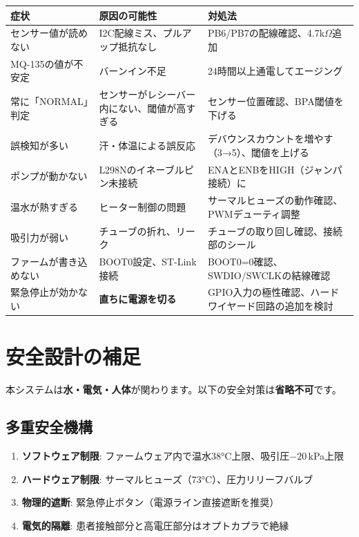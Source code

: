 \documentclass[a4paper,11pt]{article}
\begin{document}
\begin{longtable}{@{}p{4.5cm}p{4.5cm}p{5cm}@{}}
\toprule
\textbf{症状} & \textbf{原因の可能性} & \textbf{対処法} \\
\midrule
\endhead
センサー値が読めない & I2C配線ミス、プルアップ抵抗なし & PB6/PB7の配線確認、4.7k$\Omega$追加 \\
\addlinespace
MQ-135の値が不安定 & バーンイン不足 & 24時間以上通電してエージング \\
\addlinespace
常に「NORMAL」判定 & センサーがレシーバー内にない、閾値が高すぎる & センサー位置確認、BPA閾値を下げる \\
\addlinespace
誤検知が多い & 汗・体温による誤反応 & デバウンスカウントを増やす（3→5）、閾値を上げる \\
\addlinespace
ポンプが動かない & L298Nのイネーブルピン未接続 & ENAとENBをHIGH（ジャンパ接続）に \\
\addlinespace
温水が熱すぎる & ヒーター制御の問題 & サーマルヒューズの動作確認、PWMデューティ調整 \\
\addlinespace
吸引力が弱い & チューブの折れ、リーク & チューブの取り回し確認、接続部のシール \\
\addlinespace
ファームが書き込めない & BOOT0設定、ST-Link接続 & BOOT0=0確認、SWDIO/SWCLKの結線確認 \\
\addlinespace
緊急停止が効かない & \textcolor{warn}{\textbf{直ちに電源を切る}} & GPIO入力の極性確認、ハードワイヤード回路の追加を検討 \\
\bottomrule
\end{longtable}

\newpage
\section{安全設計の補足}

\begin{warningbox}
本システムは\textbf{水・電気・人体}が関わります。以下の安全対策は\textbf{省略不可}です。
\end{warningbox}

\subsection{多重安全機構}

\begin{enumerate}[leftmargin=2em]
  \item \textbf{ソフトウェア制限}: ファームウェア内で温水38°C上限、吸引圧$-20$\,kPa上限
  \item \textbf{ハードウェア制限}: サーマルヒューズ（73°C）、圧力リリーフバルブ
  \item \textbf{物理的遮断}: 緊急停止ボタン（電源ライン直接遮断を推奨）
  \item \textbf{電気的隔離}: 患者接触部分と高電圧部分はオプトカプラで絶縁
\end{enumerate}
\end{document}
